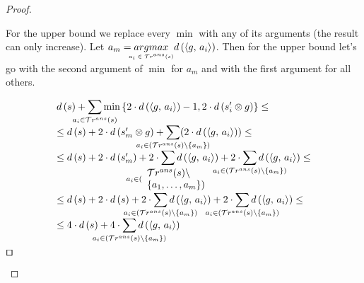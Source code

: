 \begin{proof}
\begin{enumerate}
  For the upper bound we replace every $\min$ with any of its arguments (the result can only increase). Let $a_m = \argmax{a_i \in \tra{s}} d\,(\taskst{g}{a_i})$. Then for the upper bound let's
  go with the second argument of $\min$ for $a_m$ and with the first argument for all others.
  
   \[ \begin{array}{l}
  d\,(s) + \smashoperator[lr]{\sum\limits_{a_i \in \tra{s}}} \min\,\{2\cdot d\,(\taskst{g}{a_i}) - 1, 2\cdot d\,(s'_i \otimes g)\}  \le \\
  \le d\,(s) + 2 \cdot d\,(s'_m \otimes g) + \smashoperator[lr]{\sum\limits_{a_i \in (\tra{s} \setminus \{a_m\})}} (2\cdot d\,(\taskst{g}{a_i})) \le \\
  \le d\,(s) + 2 \cdot d\,(s'_m) + 2\cdot\smashoperator[lr]{\sum\limits_{a_i \in (\begin{array}{l} \tra{s} \setminus \\ \{a_1, \dots, a_m\}) \end{array}}} d\,(\taskst{g}{a_i}) + 2\cdot\smashoperator[lr]{\sum\limits_{a_i \in (\tra{s} \setminus \{a_m\})}} d\,(\taskst{g}{a_i}) \le \\
  \le d\,(s) + 2 \cdot d\,(s) + 2\cdot\smashoperator[lr]{\sum\limits_{a_i \in (\tra{s} \setminus \{a_m\})}} d\,(\taskst{g}{a_i}) + 2\cdot\smashoperator[lr]{\sum\limits_{a_i \in (\tra{s} \setminus \{a_m\})}} d\,(\taskst{g}{a_i}) \le \\
  \le 4 \cdot d\,(s) + 4\cdot\smashoperator[lr]{\sum\limits_{a_i \in (\tra{s} \setminus \{a_m\})}} d\,(\taskst{g}{a_i}) \\
  \end{array} \] $\qed$

\end{enumerate}

\end{proof}

